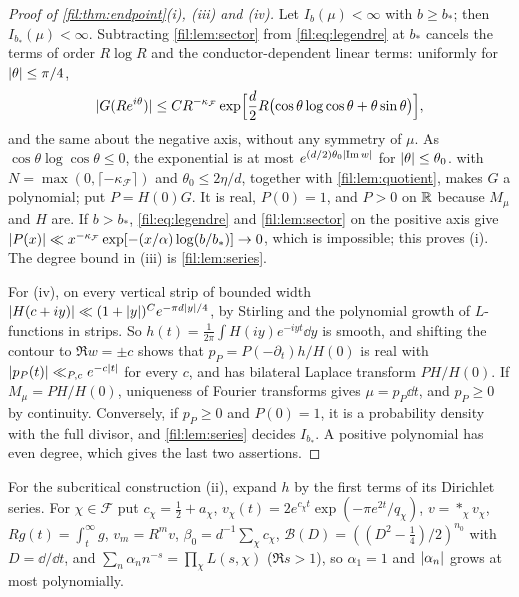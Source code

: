 \begin{proof}[Proof of \cref{fil:thm:endpoint}\textup{(i)}, \textup{(iii)} and \textup{(iv)}]
Let $I_b(\mu)<\infty$ with $b\ge b_*$; then $I_{b_*}(\mu)<\infty$. Subtracting \cref{fil:lem:sector} from
\eqref{fil:eq:legendre} at $b_*$ cancels the terms of order $R\log R$ and the conductor-dependent linear terms:
uniformly for $\lvert\theta\rvert\le\pi/4$,
\[
 \lvert G(Re^{i\theta})\rvert\le CR^{-\kappa_{\mathcal F}}\exp\Bigl[\frac d2R\bigl(\cos\theta\log\cos\theta+\theta\sin\theta\bigr)\Bigr],
\]
and the same about the negative axis, without any symmetry of $\mu$. As $\cos\theta\log\cos\theta\le0$, the
exponential is at most $e^{(d/2)\theta_0\lvert\operatorname{Im} w\rvert}$ for $\lvert\theta\rvert\le\theta_0$.  with
$N=\max(0,\lceil-\kappa_{\mathcal F}\rceil)$ and $\theta_0\le2\eta/d$, together with \cref{fil:lem:quotient}, makes $G$ a polynomial;
put $P=H(0)G$. It is real, $P(0)=1$, and $P>0$ on $\mathbb{R}$ because $M_\mu$ and $H$ are. If $b>b_*$,
\eqref{fil:eq:legendre} and \cref{fil:lem:sector} on the positive axis give
$\lvert P(x)\rvert\ll x^{-\kappa_{\mathcal F}}\exp[-(x/\alpha)\log(b/b_*)]\to0$, which is impossible; this proves (i). The degree
bound in (iii) is \cref{fil:lem:series}.

For (iv), on every vertical strip of bounded width $\lvert H(c+iy)\rvert\ll(1+\lvert y\rvert)^{C}e^{-\pi d\lvert y\rvert/4}$, by Stirling and the
polynomial growth of $L$-functions in strips. So $h(t)=\frac1{2\pi}\int H(iy)e^{-iyt}\dd y$ is smooth, and shifting the
contour to $\Re w=\pm c$ shows that $p_P=P(-\partial_t)h/H(0)$ is real with $\lvert p_P(t)\rvert\ll_{P,c}e^{-c\lvert t\rvert}$ for every
$c$, and has bilateral Laplace transform $PH/H(0)$. If $M_\mu=PH/H(0)$, uniqueness of Fourier transforms gives
$\mu=p_P\dd t$, and $p_P\ge0$ by continuity. Conversely, if $p_P\ge0$ and $P(0)=1$, it is a probability density
with the full divisor, and \cref{fil:lem:series} decides $I_{b_*}$. A positive polynomial has even degree, which
gives the last two assertions.
\end{proof}

For the subcritical construction (ii), expand $h$ by the first terms of its Dirichlet series. For $\chi\in\mathcal F$
put $c_\chi=\tfrac12+a_\chi$, $v_\chi(t)=2e^{c_\chi t}\exp(-\pi e^{2t}/q_\chi)$, $v=\mathop{\ast}_\chi v_\chi$,
$Rg(t)=\int_t^\infty g$, $v_m=R^mv$, $\beta_0=d^{-1}\sum_\chi c_\chi$, $\mathcal B(D)=((D^2-\tfrac14)/2)^{n_0}$ with
$D=\dd/\dd t$, and $\sum_n\alpha_nn^{-s}=\prod_\chi L(s,\chi)$ ($\Re s>1$), so $\alpha_1=1$ and $\lvert\alpha_n\rvert$ grows at most
polynomially.

